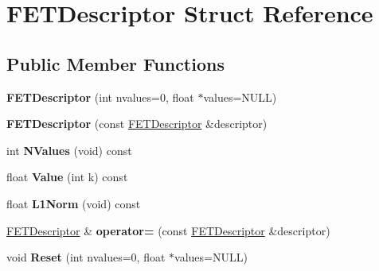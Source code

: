 \hypertarget{struct_f_e_t_descriptor}{}\section{F\+E\+T\+Descriptor Struct Reference}
\label{struct_f_e_t_descriptor}
\subsection*{Public Member Functions}
\begin{DoxyCompactItemize}
\item 
{\bfseries F\+E\+T\+Descriptor} (int nvalues=0, float $\ast$values=N\+U\+LL)\hypertarget{struct_f_e_t_descriptor_a73947942e76649c63b352f8ed8269cb9}{}\label{struct_f_e_t_descriptor_a73947942e76649c63b352f8ed8269cb9}

\item 
{\bfseries F\+E\+T\+Descriptor} (const \hyperlink{struct_f_e_t_descriptor}{F\+E\+T\+Descriptor} \&descriptor)\hypertarget{struct_f_e_t_descriptor_a1ddb40cc1ca7ed9bb2f560de05c2b49b}{}\label{struct_f_e_t_descriptor_a1ddb40cc1ca7ed9bb2f560de05c2b49b}

\item 
int {\bfseries N\+Values} (void) const \hypertarget{struct_f_e_t_descriptor_a29879b70ee544c422208b61244bc074b}{}\label{struct_f_e_t_descriptor_a29879b70ee544c422208b61244bc074b}

\item 
float {\bfseries Value} (int k) const \hypertarget{struct_f_e_t_descriptor_ab15ede5d6253fd0e791756b617c13edc}{}\label{struct_f_e_t_descriptor_ab15ede5d6253fd0e791756b617c13edc}

\item 
float {\bfseries L1\+Norm} (void) const \hypertarget{struct_f_e_t_descriptor_aaae2b49a25eb008e1f8a909cc6d43af8}{}\label{struct_f_e_t_descriptor_aaae2b49a25eb008e1f8a909cc6d43af8}

\item 
\hyperlink{struct_f_e_t_descriptor}{F\+E\+T\+Descriptor} \& {\bfseries operator=} (const \hyperlink{struct_f_e_t_descriptor}{F\+E\+T\+Descriptor} \&descriptor)\hypertarget{struct_f_e_t_descriptor_ababbeca7cfb5fe5e49758920129412c9}{}\label{struct_f_e_t_descriptor_ababbeca7cfb5fe5e49758920129412c9}

\item 
void {\bfseries Reset} (int nvalues=0, float $\ast$values=N\+U\+LL)\hypertarget{struct_f_e_t_descriptor_a2d13f9df12d9dd14ed4cc2cde6b1ce5d}{}\label{struct_f_e_t_descriptor_a2d13f9df12d9dd14ed4cc2cde6b1ce5d}


\end{DoxyCompactItemize}
